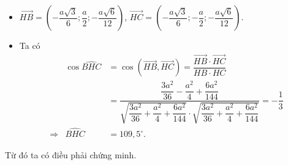 \begin{bt}
{\begin{itemize}
			\[ OH = \dfrac{AO\cdot GM}{AG}=\dfrac{a\sqrt{6}}{12}\Rightarrow H\left(\dfrac{a\sqrt{3}}{6};0;\dfrac{a\sqrt{6}}{12}\right).\]
			\item $\overrightarrow{HB}=\left(-\dfrac{a\sqrt{3}}{6};\dfrac{a}{2};-\dfrac{a\sqrt{6}}{12}\right)$, $\overrightarrow{HC}=\left(-\dfrac{a\sqrt{3}}{6};-\dfrac{a}{2};-\dfrac{a\sqrt{6}}{12}\right)$.
			\item Ta có
			\begin{eqnarray*}
				& \cos \widehat{BHC} & =\cos \left(\overrightarrow{HB},\overrightarrow{HC}\right) = \dfrac{\overrightarrow{HB}\cdot \overrightarrow{HC}}{HB\cdot HC}\\
				& & = \dfrac{\dfrac{3a^2}{36}-\dfrac{a^2}{4}+\dfrac{6a^2}{144}}{\sqrt{\dfrac{3a^2}{36}+\dfrac{a^2}{4}+\dfrac{6a^2}{144}}\cdot \sqrt{\dfrac{3a^2}{36}+\dfrac{a^2}{4}+\dfrac{6a^2}{144}}} = -\dfrac{1}{3}\\
				\Rightarrow &  \widehat{BHC} & =109{,}5^\circ.
			\end{eqnarray*}
		\end{itemize}
		Từ đó ta có điều phải chứng minh.
	}
\end{bt}

